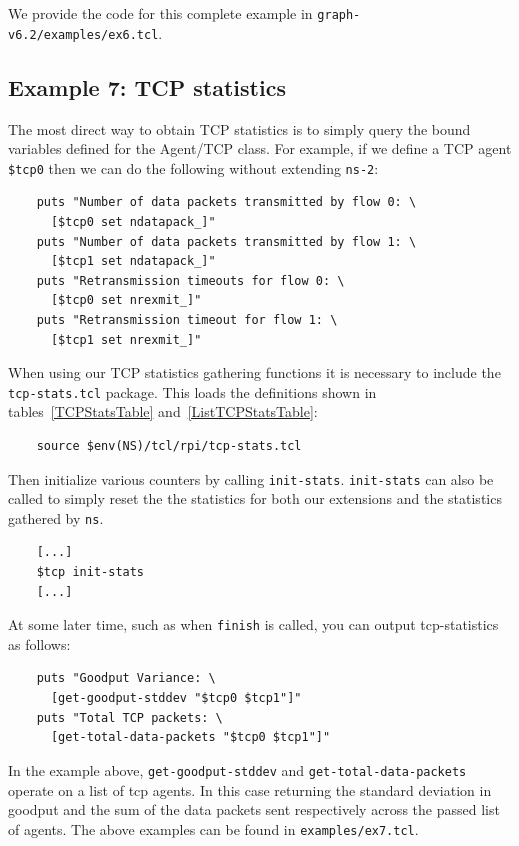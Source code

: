 \documentclass[11pt]{article}
\begin{document}
We provide the code for this complete example in
\verb|graph-v6.2/examples/ex6.tcl|.

\subsection{Example 7: TCP statistics}

The most direct way to obtain TCP statistics is to simply 
query the bound variables defined for the Agent/TCP class.  For
example, if we define a TCP agent \verb|$tcp0| then we can do
the following without extending \verb|ns-2|:

\begin{verbatim}
    puts "Number of data packets transmitted by flow 0: \
      [$tcp0 set ndatapack_]"
    puts "Number of data packets transmitted by flow 1: \
      [$tcp1 set ndatapack_]"
    puts "Retransmission timeouts for flow 0: \
      [$tcp0 set nrexmit_]"
    puts "Retransmission timeout for flow 1: \
      [$tcp1 set nrexmit_]"
\end{verbatim}

When using our TCP statistics gathering functions it is necessary to
include the \verb|tcp-stats.tcl| package.  This loads the definitions
shown in tables~\ref{TCPStatsTable} and~\ref{ListTCPStatsTable}:

\begin{verbatim}
    source $env(NS)/tcl/rpi/tcp-stats.tcl
\end{verbatim}

Then initialize various counters by calling
\verb|init-stats|.  \verb|init-stats| can also be called to simply
reset the the statistics for both our extensions and the statistics
gathered by \verb|ns|.

\begin{verbatim} 
    [...]
    $tcp init-stats
    [...]
\end{verbatim}

At some later time, such as when \verb|finish| is called, 
you can output tcp-statistics as follows:

\begin{verbatim}
    puts "Goodput Variance: \
      [get-goodput-stddev "$tcp0 $tcp1"]"
    puts "Total TCP packets: \
      [get-total-data-packets "$tcp0 $tcp1"]"
\end{verbatim}

In the example above, \verb|get-goodput-stddev| and
\verb|get-total-data-packets| operate on a list of tcp agents.  In this
case returning the standard deviation in goodput and the sum of the
data packets sent respectively across the passed list of agents.
The above examples can be found in \verb|examples/ex7.tcl|.
\end{document}
